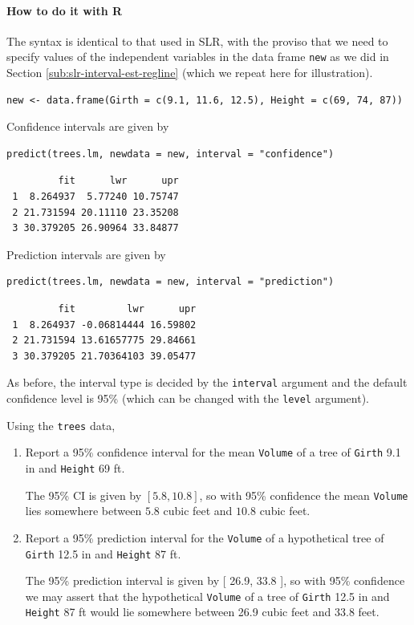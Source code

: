 \documentclass[captions=tableheading]{scrbook}
\begin{document}
\paragraph*{How to do it with \textsf{R}}

The syntax is identical to that used in SLR, with the proviso that we need to specify values of the independent variables in the data frame \texttt{new} as we did in Section \ref{sub:slr-interval-est-regline} (which we repeat here for illustration).


\begin{verbatim}
new <- data.frame(Girth = c(9.1, 11.6, 12.5), Height = c(69, 74, 87))
\end{verbatim}

Confidence intervals are given by


\begin{verbatim}
predict(trees.lm, newdata = new, interval = "confidence")
\end{verbatim}

\begin{verbatim}
         fit      lwr      upr
 1  8.264937  5.77240 10.75747
 2 21.731594 20.11110 23.35208
 3 30.379205 26.90964 33.84877
\end{verbatim}



Prediction intervals are given by


\begin{verbatim}
predict(trees.lm, newdata = new, interval = "prediction")
\end{verbatim}

\begin{verbatim}
         fit         lwr      upr
 1  8.264937 -0.06814444 16.59802
 2 21.731594 13.61657775 29.84661
 3 30.379205 21.70364103 39.05477
\end{verbatim}



As before, the interval type is decided by the \texttt{interval} argument and the default confidence level is 95\% (which can be changed with the \texttt{level} argument).

\begin{example}
Using the \texttt{trees} data, 

\begin{enumerate}
\item Report a 95\% confidence interval for the mean \texttt{Volume} of a tree of \texttt{Girth} 9.1 in and \texttt{Height} 69 ft.

   The 95\% CI is given by \( [  5.8,  10.8 ] \), so with 95\% confidence the mean \texttt{Volume} lies somewhere between \(  5.8 \) cubic feet and \(  10.8 \) cubic feet.
\item Report a 95\% prediction interval for the \texttt{Volume} of a hypothetical tree of \texttt{Girth} 12.5 in and \texttt{Height} 87 ft.

   The 95\% prediction interval is given by [  26.9,  33.8 ], so with 95\% confidence we may assert that the hypothetical \texttt{Volume} of a tree of \texttt{Girth} 12.5 in and \texttt{Height} 87 ft would lie somewhere between  26.9 cubic feet and  33.8 feet.
\end{enumerate}

\end{example}
\end{document}
